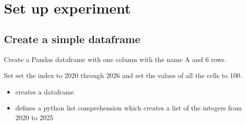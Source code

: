 \documentclass[letterpaper,10pt,english]{jupyterBook}
\begin{document}
\section{Set up experiment}
\label{\detokenize{content/howto/update/extending_dataframes:set-up-experiment}}

\subsection{Create a  simple dataframe}
\label{\detokenize{content/howto/update/extending_dataframes:create-a-simple-dataframe}}
\sphinxAtStartPar
Create a Pandas dataframe with one column with the name A and 6 rows.

\sphinxAtStartPar
Set set the index to 2020 through 2026 and set the values of all the cells to 100.
\begin{itemize}
\item {} 
\sphinxAtStartPar
{} creates a dataframe  

\item {} 
\sphinxAtStartPar
{} defines a python list comprehension which creates a list of the integers from 2020 to 2025

\end{itemize}
\end{document}
